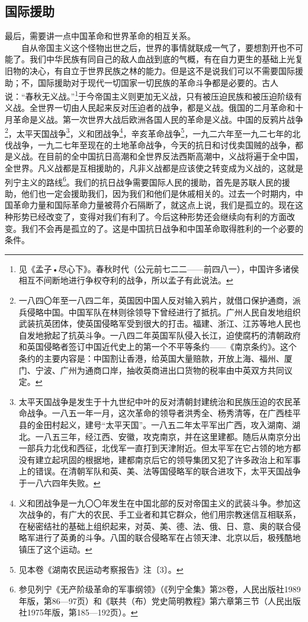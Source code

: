 \documentclass[cn,11pt,chinese]{elegantbook}
\def\myformat#1{\hfil\hfil #1}
\begin{document}
\subsection*{\myformat{国际援助}}
最后，需要讲一点中国革命和世界革命的相互关系。\\
　　自从帝国主义这个怪物出世之后，世界的事情就联成一气了，要想割开也不可能了。我们中华民族有同自己的敌人血战到底的气概，有在自力更生的基础上光复旧物的决心，有自立于世界民族之林的能力。但是这不是说我们可以不需要国际援助；不，国际援助对于现代一切国家一切民族的革命斗争都是必要的。古人说：“春秋无义战。”\footnote[34]{ 见《孟子•尽心下》。春秋时代（公元前七二二——前四八一），中国许多诸侯相互不间断地进行争权夺利的战争，所以孟子有此说法。}于今帝国主义则更加无义战，只有被压迫民族和被压迫阶级有义战。全世界一切由人民起来反对压迫者的战争，都是义战。俄国的二月革命和十月革命是义战。第一次世界大战后欧洲各国人民的革命是义战。中国的反鸦片战争\footnote[35]{ 一八四〇年至一八四二年，英国因中国人反对输入鸦片，就借口保护通商，派兵侵略中国。中国军队在林则徐领导下曾经进行了抵抗。广州人民自发地组织武装抗英团体，使英国侵略军受到很大的打击。福建、浙江、江苏等地人民也自发地掀起了抗英斗争。一八四二年英国军队侵入长江，迫使腐朽的清朝政府和英国侵略者签订中国近代史上的第一个不平等条约——《南京条约》。这个条约的主要内容是：中国割让香港，给英国大量赔款，开放上海、福州、厦门、宁波、广州为通商口岸，抽收英商进出口货物的税率由中英双方共同议定。}，太平天国战争\footnote[36]{ 太平天国战争是发生于十九世纪中叶的反对清朝封建统治和民族压迫的农民革命战争。一八五一年一月，这次革命的领导者洪秀全、杨秀清等，在广西桂平县的金田村起义，建号“太平天国”。一八五二年太平军出广西，攻入湖南、湖北。一八五三年，经江西、安徽，攻克南京，并在这里建都。随后从南京分出一部兵力北伐和西征，北伐军一直打到天津附近。但太平军在它占领的地方都没有建立起巩固的根据地，建都南京后它的领导集团又犯了许多政治上和军事上的错误。在清朝军队和英、美、法等国侵略军的联合进攻下，太平天国战争于一八六四年失败。}，义和团战争\footnote[37]{ 义和团战争是一九〇〇年发生在中国北部的反对帝国主义的武装斗争。参加这次战争的，有广大的农民、手工业者和其它群众，他们用宗教迷信互相联系，在秘密结社的基础上组织起来，对英、美、德、法、俄、日、意、奥的联合侵略军进行了英勇的斗争。八国的联合侵略军在占领天津、北京以后，极残酷地镇压了这个运动。}，辛亥革命战争\footnote[38]{ 见本卷《湖南农民运动考察报告》注〔3〕。}，一九二六年至一九二七年的北伐战争，一九二七年至现在的土地革命战争，今天的抗日和讨伐卖国贼的战争，都是义战。在目前的全中国抗日高潮和全世界反法西斯高潮中，义战将遍于全中国，全世界。凡义战都是互相援助的，凡非义战都是应该使之转变成为义战的，这就是列宁主义的路线\footnote[39]{ 参见列宁《无产阶级革命的军事纲领》（《列宁全集》第28卷，人民出版社1989年版，第86—97页）和《联共（布）党史简明教程》第六章第三节（人民出版社1975年版，第185—192页）。}。我们的抗日战争需要国际人民的援助，首先是苏联人民的援助，他们也一定会援助我们，因为我们和他们是休戚相关的。过去一个时期内，中国革命力量和国际革命力量被蒋介石隔断了，就这点上说，我们是孤立的。现在这种形势已经改变了，变得对我们有利了。今后这种形势还会继续向有利的方面改变。我们不会再是孤立的了。这是中国抗日战争和中国革命取得胜利的一个必要的条件。\\
\end{document}
